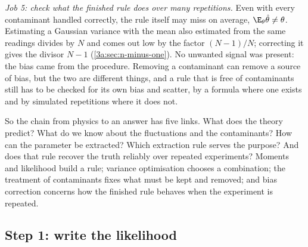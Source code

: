 \emph{Job 5: check what the finished rule does over many repetitions.} Even with every contaminant handled correctly, the rule itself may miss on average, $\E_\theta\hat\theta\neq\theta$. Estimating a Gaussian variance with the mean also estimated from the same readings divides by $N$ and comes out low by the factor $(N-1)/N$; correcting it gives the divisor $N-1$ (\cref{3a:sec:n-minus-one}). No unwanted signal was present: the bias came from the procedure. Removing a contaminant can remove a source of bias, but the two are different things, and a rule that is free of contaminants still has to be checked for its own bias and scatter, by a formula where one exists and by simulated repetitions where it does not.

So the chain from physics to an answer has five links. What does the theory predict? What do we know about the fluctuations and the contaminants? How can the parameter be extracted? Which extraction rule serves the purpose? And does that rule recover the truth reliably over repeated experiments? Moments and likelihood build a rule; variance optimisation chooses a combination; the treatment of contaminants fixes what must be kept and removed; and bias correction concerns how the finished rule behaves when the experiment is repeated.

\subsection{Step 1: write the likelihood}
\label{3b:sec:recipe-like}

